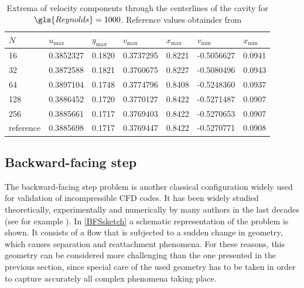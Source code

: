 \begin{table}[]
	\centering
	\begin{tabular}{lllllrr}
		\hline
		$N$      & $u_{\text{max}}$ & $y_{\text{max}}$ & $v_{\text{max}}$ & $x_{\text{max}}$ & \multicolumn{1}{l}{$v_{\text{min}}$} & \multicolumn{1}{l}{$x_{\text{min}}$} \\ \hline
		16        & 0.3852327        & 0.1820           & 0.3737295        & 0.8221           & -0.5056627                           & 0.0941                               \\
		32        & 0.3872588        & 0.1821           & 0.3760675        & 0.8227           & -0.5080496                           & 0.0943                               \\
		64        & 0.3897104        & 0.1748           & 0.3774796        & 0.8408           & -0.5248360                           & 0.0937                               \\
		128       & 0.3886452        & 0.1720           & 0.3770127        & 0.8422           & -0.5271487                           & 0.0907                               \\
		256       & 0.3885661        & 0.1717           & 0.3769403        & 0.8422           & -0.5270653                           & 0.0907                               \\
		reference & 0.3885698        & 0.1717           & 0.3769447        & 0.8422           & \multicolumn{1}{l}{-0.5270771}       & \multicolumn{1}{l}{0.0908}           \\ \hline
	\end{tabular}
	\caption{Extrema of velocity components through the centerlines of the cavity for $\gls{Reynolds} = 1000$. Reference values obtainder from \cite{botellaBenchmarkSpectralResults1998} }
	\label{tab:LidCavityExtrema}
\end{table}
	\FloatBarrier
\newpage

\subsection{Backward-facing step}\label{ssec:BackwardFacingStep}
The backward-facing step problem is another classical configuration widely used for validation of incompressible CFD codes. It has been widely studied theoretically, experimentally and numerically by many authors in the last decades (see for example \cite{armalyExperimentalTheoreticalInvestigation1983,barkleyThreedimensionalInstabilityFlow2000,biswasBackwardFacingStepFlows2004} ).  In \cref{BFSsketch} a schematic representation of the problem is shown. It consists of a flow that is subjected to a sudden change in geometry, which causes separation and reattachment phenomena. For these reasons, this geometry can be considered more challenging than the one presented in the previous section, since special care of the used geometry has to be taken in order to capture accurately all complex phenomena taking place.

